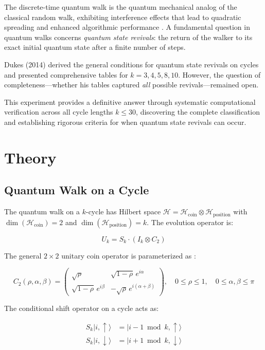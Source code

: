 \documentclass[12pt]{article}
\begin{document}
The discrete-time quantum walk is the quantum mechanical analog of the classical random walk, exhibiting interference effects that lead to quadratic spreading and enhanced algorithmic performance \cite{aharonov1993, kempe2003}. A fundamental question in quantum walks concerns \textit{quantum state revivals}: the return of the walker to its exact initial quantum state after a finite number of steps.

Dukes (2014) \cite{dukes2014} derived the general conditions for quantum state revivals on cycles and presented comprehensive tables for \(k=3,4,5,8,10\). However, the question of completeness---whether his tables captured \textit{all} possible revivals---remained open.

This experiment provides a definitive answer through systematic computational verification across all cycle lengths \(k \leq 30\), discovering the complete classification and establishing rigorous criteria for when quantum state revivals can occur.

\section{Theory}

\subsection{Quantum Walk on a Cycle}

The quantum walk on a \(k\)-cycle has Hilbert space \(\mathcal{H} = \mathcal{H}_{\text{coin}} \otimes \mathcal{H}_{\text{position}}\) with \(\dim(\mathcal{H}_{\text{coin}}) = 2\) and \(\dim(\mathcal{H}_{\text{position}}) = k\). The evolution operator is:

\[
U_k = S_k \cdot (I_k \otimes C_2)
\]

The general \(2 \times 2\) unitary coin operator is parameterized as \cite{tregenna2003}:

\[
C_2(\rho, \alpha, \beta) = \begin{pmatrix}
\sqrt{\rho} & \sqrt{1-\rho}\, e^{i\alpha} \\
\sqrt{1-\rho}\, e^{i\beta} & -\sqrt{\rho}\, e^{i(\alpha+\beta)}
\end{pmatrix}, \quad 0 \leq \rho \leq 1, \quad 0 \leq \alpha, \beta \leq \pi
\]

The conditional shift operator on a cycle acts as:

\begin{align}
S_k|i, \uparrow\rangle &= |i-1 \bmod k, \uparrow\rangle \\
S_k|i, \downarrow\rangle &= |i+1 \bmod k, \downarrow\rangle
\end{align}
\end{document}
